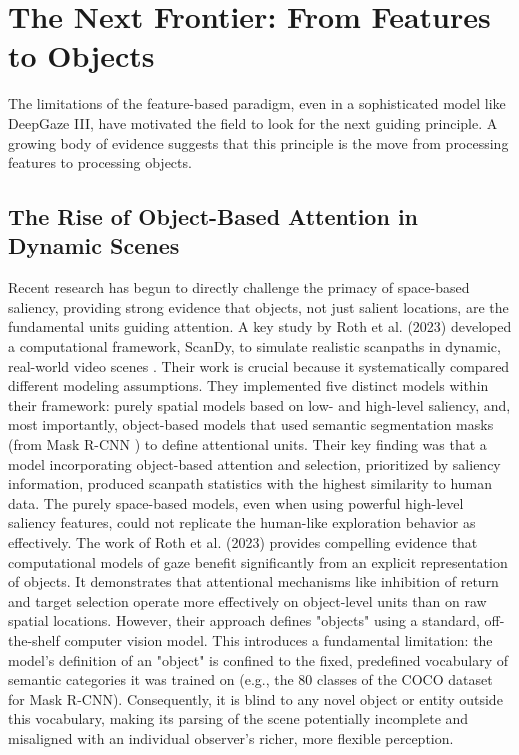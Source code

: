 \section{The Next Frontier: From Features to Objects}
\label{sec:sota_next_frontier}
The limitations of the feature-based paradigm, even in a sophisticated model like DeepGaze III, have motivated the field to look for the next guiding principle. A growing body of evidence suggests that this principle is the move from processing features to processing objects.

\subsection{The Rise of Object-Based Attention in Dynamic Scenes}

Recent research has begun to directly challenge the primacy of space-based saliency, providing strong evidence that objects, not just salient locations, are the fundamental units guiding attention.
A key study by Roth et al. (2023) developed a computational framework, ScanDy, to simulate realistic scanpaths in dynamic, real-world video scenes \cite{10.1371/journal.pcbi.1011512}.
Their work is crucial because it systematically compared different modeling assumptions. They implemented five distinct models within their framework: purely spatial models based on low- and high-level saliency, and, most importantly, object-based models that used semantic segmentation masks (from Mask R-CNN \cite{he2017mask}) to define attentional units. Their key finding was that a model incorporating object-based attention and selection, prioritized by saliency information, produced scanpath statistics with the highest similarity to human data. The purely space-based models, even when using powerful high-level saliency features, could not replicate the human-like exploration behavior as effectively.
The work of Roth et al. (2023) provides compelling evidence that computational models of gaze benefit significantly from an explicit representation of objects. It demonstrates that attentional mechanisms like inhibition of return and target selection operate more effectively on object-level units than on raw spatial locations. However, their approach defines "objects" using a standard, off-the-shelf computer vision model. This introduces a fundamental limitation: the model’s definition of an "object" is confined to the fixed, predefined vocabulary of semantic categories it was trained on (e.g., the 80 classes of the COCO dataset for Mask R-CNN). Consequently, it is blind to any novel object or entity outside this vocabulary, making its parsing of the scene potentially incomplete and misaligned with an individual observer's richer, more flexible perception.



